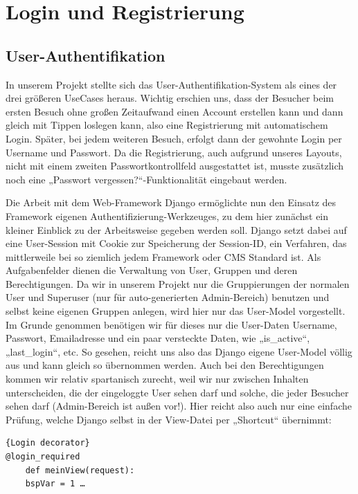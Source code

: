 \documentclass[titlepage, 12pt,a4paper]{scrartcl}
\begin{document}
\section{Login und Registrierung}\label{registrierung}
\subsection{User-Authentifikation}
In unserem Projekt stellte sich das User-Authentifikation-System als eines der
drei größeren UseCases heraus. Wichtig erschien uns, dass der Besucher beim 
ersten Besuch ohne großen Zeitaufwand einen Account erstellen kann und dann 
gleich mit Tippen loslegen kann, also eine Registrierung mit automatischem 
Login. Später, bei jedem weiteren Besuch, erfolgt dann der gewohnte Login per 
Username und Passwort. Da die Registrierung, auch aufgrund unseres Layouts, 
nicht mit einem zweiten Passwortkontrollfeld ausgestattet ist, musste
zusätzlich noch eine „Passwort vergessen?“-Funktionalität eingebaut werden.

Die Arbeit mit dem Web-Framework Django ermöglichte nun den Einsatz des 
Framework eigenen Authentifizierung-Werkzeuges, zu dem hier zunächst ein
kleiner Einblick zu der Arbeitsweise gegeben werden soll. Django setzt dabei
auf eine User-Session mit Cookie zur Speicherung der Session-ID, ein Verfahren,
das mittlerweile bei so ziemlich jedem Framework oder CMS Standard ist. Als 
Aufgabenfelder dienen die Verwaltung von User, Gruppen und deren
Berechtigungen. Da wir in unserem Projekt nur die Gruppierungen der normalen 
User und Superuser (nur für auto-generierten Admin-Bereich) benutzen und selbst
keine eigenen Gruppen anlegen, wird hier nur das User-Model vorgestellt. Im
Grunde genommen benötigen wir für dieses nur die User-Daten Username, Passwort,
Emailadresse und ein paar versteckte Daten, wie „is\_active“, „last\_login“,
etc. So gesehen, reicht uns also das Django eigene User-Model völlig aus und 
kann gleich so übernommen werden. Auch bei den Berechtigungen kommen wir relativ 
spartanisch zurecht, weil wir nur zwischen Inhalten unterscheiden, die der 
eingeloggte User sehen darf und solche, die jeder Besucher sehen darf 
(Admin-Bereich ist außen vor!). Hier reicht also auch nur eine einfache
Prüfung,  welche Django selbst in der View-Datei per „Shortcut“ übernimmt:

\begin{lstlisting}[caption=Decorator]{Login decorator}
@login_required
    def meinView(request):
    bspVar = 1 …
\end{lstlisting}
\end{document}
